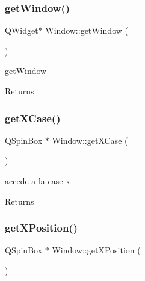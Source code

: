 \subsubsection{\texorpdfstring{get\+Window()}{getWindow()}}
{\footnotesize\ttfamily Q\+Widget$\ast$ Window\+::get\+Window (\begin{DoxyParamCaption}{ }\end{DoxyParamCaption})\hspace{0.3cm}{\ttfamily [inline]}}



get\+Window 

\begin{DoxyReturn}{Returns}

\end{DoxyReturn}
\mbox{\label{class_window_ad4653c5a933dad023b65a13e41542f7b}} 
\subsubsection{\texorpdfstring{get\+X\+Case()}{getXCase()}}
{\footnotesize\ttfamily Q\+Spin\+Box $\ast$ Window\+::get\+X\+Case (\begin{DoxyParamCaption}{ }\end{DoxyParamCaption})\hspace{0.3cm}{\ttfamily [inline]}}



accede a la case x 

\begin{DoxyReturn}{Returns}

\end{DoxyReturn}
\mbox{\label{class_window_a4748fb7d7a0de845106effeec06a30a5}} 
\subsubsection{\texorpdfstring{get\+X\+Position()}{getXPosition()}}
{\footnotesize\ttfamily Q\+Spin\+Box $\ast$ Window\+::get\+X\+Position (\begin{DoxyParamCaption}{ }\end{DoxyParamCaption})\hspace{0.3cm}{\ttfamily [inline]}}



